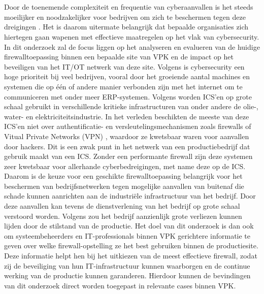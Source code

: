 
\chapter{}%
\label{ch:inleiding}

\section{}%
\label{sec:probleemstelling}

Door de toenemende complexiteit en frequentie van cyberaanvallen is het steeds moeilijker en noodzakelijker voor bedrijven om zich te beschermen tegen deze dreigingen \autocite{saravanan2019}. Het is daarom uitermate belangrijk dat bepaalde organisaties zich hiertegen gaan wapenen met effectieve maatregelen op het vlak van cybersecurity. In dit onderzoek zal de focus liggen op het analyseren en evalueren van de huidige  firewalltoepassing binnen een bepaalde site van VPK en de impact op het beveiligen van het IT/OT netwerk van deze site.
Volgens \textcite{pan2017} is cybersecurity een hoge prioriteit bij veel bedrijven, vooral door het groeiende aantal machines en systemen die op één of andere manier verbonden zijn met het internet om te communiceren met onder meer ERP-systemen.  Volgens \textcite{Lin2017} worden ICS'en op grote schaal gebruikt in verschillende kritieke infrastructuren van onder andere de olie-, water- en elektriciteitsindustrie. In het verleden beschikten de meeste van deze ICS'en niet over authentificatie- en versleutelingsmechanismen zoals firewalls of Vitual Private Networks (VPN) , waardoor ze kwetsbaar waren voor aanvallen door hackers. Dit is een zwak punt in het netwerk van een productiebedrijf dat gebruik maakt van een ICS. Zonder een performante firewall zijn deze systemen zeer kwetsbaar voor allerhande cyberbedreigingen, met name deze op de ICS. Daarom is de keuze voor een geschikte firewalltoepassing belangrijk voor het beschermen van bedrijfsnetwerken tegen mogelijke aanvallen van buitenaf die schade kunnen aanrichten aan de industriële infrastructuur van het bedrijf. Door deze aanvallen kan tevens de dienstverlening van het bedrijf op grote schaal verstoord worden. Volgens \textcite{Nwanya2017} zou het bedrijf aanzienlijk grote verliezen kunnen lijden door de stilstand van de productie. Het doel van dit onderzoek is dan ook om systeembeheerders en IT-professionals binnen VPK gerichtere informatie te geven over welke firewall-opstelling ze het best gebruiken binnen de productiesite. Deze informatie helpt hen bij het uitkiezen van de meest effectieve firewall, zodat zij de beveiliging van hun IT-infrastructuur kunnen waarborgen en de continue werking van de productie kunnen garanderen. Hierdoor kunnen de bevindingen van dit onderzoek direct worden toegepast in relevante cases binnen VPK.

